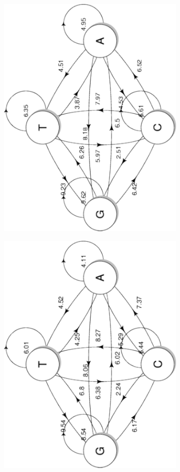 \documentclass{article}
\begin{document}
\begin{figure}
   \centering
   \begin{subfigure}{.5\textwidth}
      \centering
      \includegraphics[width=.7\textwidth,natwidth=100,natheight=100,angle=270]{hg38.pdf}
      \caption{}
      \label{fig:hg38_transition}
   \end{subfigure}%
   \begin{subfigure}{.5\textwidth}
      \centering
      \includegraphics[width=.7\textwidth,natwidth=100,natheight=100,angle=270]{mm10.pdf}

\end{subfigure}
\end{figure}
\end{document}
